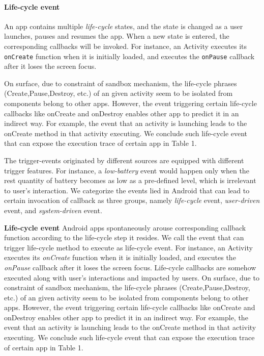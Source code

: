 \paragraph{Life-cycle event} An app contains multiple \emph{life-cycle} states, and the state is changed as a user launches, pauses and resumes the app. 
When a new state is entered, the corresponding callbacks will be invoked. 
For instance, an Activity executes its \texttt{onCreate} function when it is initially loaded, and executes the \texttt{onPause} callback after it loses the screen focus. 

On surface, due to constraint of sandbox mechanism, the life-cycle phrases (Create,Pause,Destroy, etc.) of an given activity seem to be isolated from components belong to other apps. 
However, the event triggering certain life-cycle callbacks like onCreate and onDestroy enables other app to predict it in an indirect way. For example, the event that an activity is launching leads to the onCreate method in that activity executing. We conclude such life-cycle event that can expose the execution trace of certain app in Table 1.



The trigger-events originated by different sources are equipped with different trigger features. For instance, a \textit{low-battery} event would happen only when the rest quantity of battery becomes as low as a pre-defined level, which is irrelevant to user's interaction. We categorize the events lied in Android that can lead to certain invocation of callback as three groups, namely \textit{life-cycle} event, \textit{user-driven} event, and \textit{system-driven} event.

\textbf{Life-cycle event} Android apps spontaneously arouse corresponding callback function according to the life-cycle step it resides. We call the event that can trigger life-cycle method to execute as life-cycle event. For instance, an Activity executes its \textit{onCreate} function when it is initially loaded, and executes the \textit{onPause} callback after it loses the screen focus. Life-cycle callbacks are somehow executed along with user's interactions and impacted by users. On surface, due to constraint of sandbox mechanism, the life-cycle phrases (Create,Pause,Destroy, etc.) of an given activity seem to be isolated from components belong to other apps. However, the event triggering certain life-cycle callbacks like onCreate and onDestroy enables other app to predict it in an indirect way. For example, the event that an activity is launching leads to the onCreate method in that activity executing. We conclude such life-cycle event that can expose the execution trace of certain app in Table 1.

